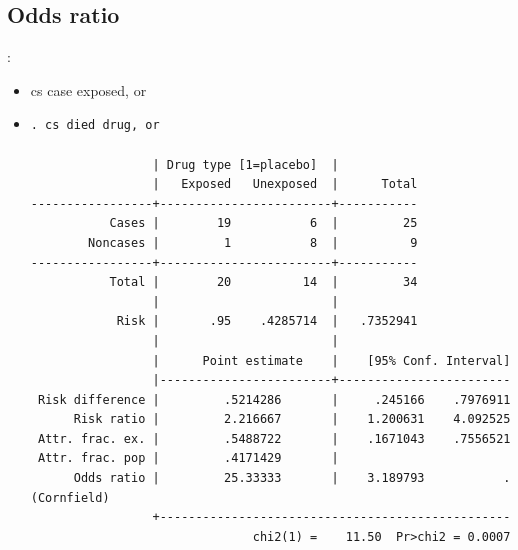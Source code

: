 \subsection{Odds ratio}
\begin{frame}[fragile]{\secname: \subsecname}	
\begin{itemize}
\item cs case exposed, or
\item[] \scriptsize \begin{verbatim}
. cs died drug, or

                 | Drug type [1=placebo]  |
                 |   Exposed   Unexposed  |      Total
-----------------+------------------------+-----------
           Cases |        19           6  |         25
        Noncases |         1           8  |          9
-----------------+------------------------+-----------
           Total |        20          14  |         34
                 |                        |
            Risk |       .95    .4285714  |   .7352941
                 |                        |
                 |      Point estimate    |    [95% Conf. Interval]
                 |------------------------+------------------------
 Risk difference |         .5214286       |     .245166    .7976911 
      Risk ratio |         2.216667       |    1.200631    4.092525 
 Attr. frac. ex. |         .5488722       |    .1671043    .7556521 
 Attr. frac. pop |         .4171429       |
      Odds ratio |         25.33333       |    3.189793           . (Cornfield)
                 +-------------------------------------------------
                               chi2(1) =    11.50  Pr>chi2 = 0.0007
 	
\end{verbatim}
\end{itemize}
\end{frame}

